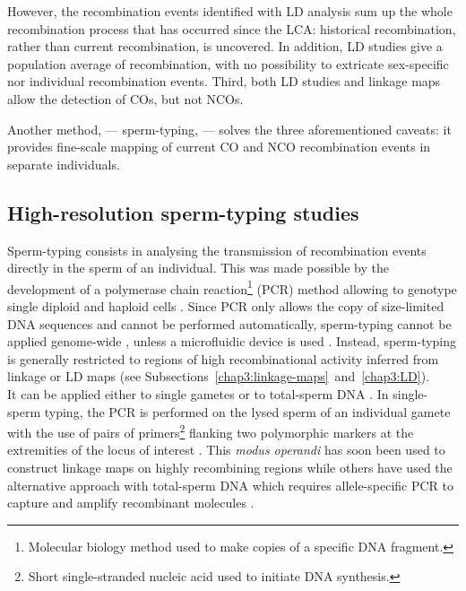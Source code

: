 However, the recombination events identified with LD analysis sum up the whole recombination process that has occurred since the LCA\@: historical recombination, rather than current recombination, is uncovered.
In addition, LD studies give a population average of recombination, with no possibility to extricate sex-specific nor individual recombination events.
Third, both LD studies and linkage maps allow the detection of COs, but not NCOs.

Another method, — sperm-typing, — solves the three aforementioned caveats: it provides fine-scale mapping of current CO and NCO recombination events in separate individuals.



\subsection{High-resolution sperm-typing studies}%

Sperm-typing consists in analysing the transmission of recombination events directly in the sperm of an individual.
This was made possible by the development of a polymerase chain reaction\footnote{Molecular biology method used to make copies of a specific DNA fragment.} (PCR) method allowing to genotype single diploid and haploid cells \citep{li1988amplification}.
Since PCR only allows the copy of size-limited DNA sequences and cannot be performed automatically, sperm-typing cannot be applied genome-wide \citep{coop2008highresolution}, unless a microfluidic device is used \citep{fan2011wholegenome,wang2012genomewide}.
Instead, sperm-typing is generally restricted to regions of high recombinational activity inferred from linkage or LD maps (see Subsections~\ref{chap3:linkage-maps}~and~\ref{chap3:LD}).\\

It can be applied either to single gametes or to total-sperm DNA \citep[reviewed in][]{arnheim2003hot}.
In single-sperm typing, the PCR is performed on the lysed sperm of an individual gamete with the use of pairs of primers\footnote{Short single-stranded nucleic acid used to initiate DNA synthesis.} flanking two polymorphic markers at the extremities of the locus of interest \citep{cui1989singlesperm,lien1993simple}.
This \textit{modus operandi} has soon been used to construct linkage maps on highly recombining regions \citep{schmitt1994multipoint,lien2000evidence,cullen2002highresolution} while others \citep{tusie-luna1995gene, jeffreys1998highresolution, jeffreys2001intensely, guillon2002initiation} have used the alternative approach with total-sperm DNA which requires allele-specific PCR to capture and amplify recombinant molecules \citep{wu1989allelespecific}.

